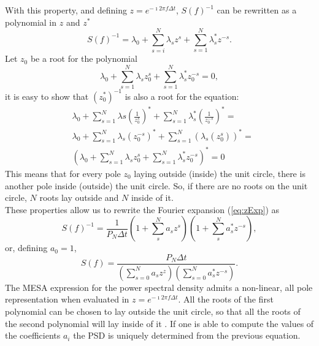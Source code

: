 \documentclass[twocolumn,showpacs,preprintnumbers,nofootinbib,prd,
superscriptaddress,10pt]{revtex4-1}
\begin{document}
With this property, and defining $z = e^{-\imath 2 \pi f \Delta t}$, $S(f)^{-1}$ can be rewritten as a polynomial in $z$ and $z^*$
\begin{equation}
    \label{eq:zExp}
    S(f)^{-1} = \lambda_0 + \sum_{s = i}^N \lambda_s z^s + \sum_{s = 1}^N \lambda^*_s z^{-s}.
\end{equation}
Let $z_0$ be a root for the polynomial
\begin{equation}
    \nonumber
    \lambda_0 + \sum_{s = 1}^N \lambda_s z_0^s + \sum_{s = 1}^N \lambda^*_s z_0^{-s} = 0,
\end{equation}
it is easy to show that $(z_0^*)^{-1}$ is also a root for the equation: 
\begin{align}
    \nonumber 
    &\lambda_0 + \sum_{s = 1}^{N} \lambda s \left(\frac{1}{z_0^s} \right)^* + \sum_{s = 1}^N \lambda^*_s \left(\frac{1 }{z_0^{-s}}\right)^* = \\ \nonumber 
    &\lambda_0 + \sum_{s = 1}^N \lambda_s (z_0^{-s})^* + \sum_{s=1}^N \left(\lambda_s (z_0^s)\right)^* = \\ \nonumber 
    &\left(\lambda_0 + \sum_{s=1}^N \lambda_s z_0^s + \sum_{s = 1}^N \lambda^*_s z_0^{-s}\right)^* = 0 
\end{align}
This means that for every pole $z_0$ laying outside (inside) the unit circle, there is another pole inside (outside) the unit circle.  So, if there are no roots on the unit circle, $N$ roots lay outside and $N$ inside of it. \\ 
These properties allow us to rewrite the Fourier expansion (\ref{eq:zExp}) as \cite{1975STIN...7714318B}
\begin{equation}\nonumber 
    S(f)^{-1} = \frac{1}{P_N \Delta t} \left(1 + \sum_{s}^N a_s z^s\right)\left(1 + \sum_s^N  a^*_s z^{-s}\right),
\end{equation}
or, defining $a_0 = 1$,
\begin{equation}\label{eq:MESApsd}
    S(f) = \frac{P_N \Delta t}{\left(\sum_{s=0}^N a_s z^z\right)\left(\sum_{s = 0}^N a^*_s z^{-s}\right)}. 
\end{equation}
The MESA expression for the power spectral density admits a non-linear, all pole representation when evaluated in $z = e^{-\imath 2 \pi f \Delta t}$. All the roots of the first polynomial can be chosen to lay outside the unit circle, so that all the roots of the second polynomial will lay inside of it \cite{1975STIN...7714318B}. 
If one is able to compute the values of the coefficients $a_i$ the PSD is uniquely determined from the previous equation. \\ 
\end{document}
